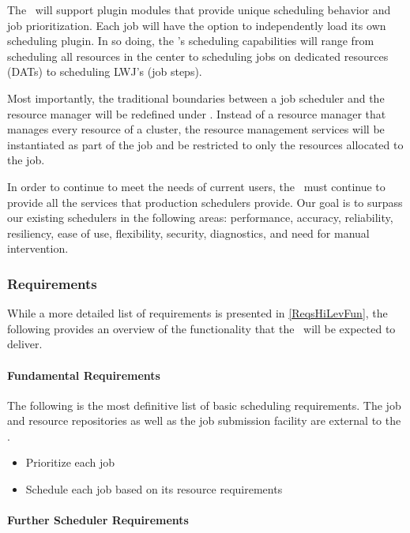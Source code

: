 The \ngjs\ will support plugin modules that provide unique scheduling
behavior and job prioritization.  Each job will have the option to
independently load its own scheduling plugin.  In so doing, the
\ngjs's scheduling capabilities will range from scheduling all
resources in the center to scheduling jobs on dedicated resources
(DATs) to scheduling LWJ's (job steps).

Most importantly, the traditional boundaries between a job scheduler
and the resource manager will be redefined under \ngrm.  Instead of a
resource manager that manages every resource of a cluster, the
resource management services will be instantiated as part of the job
and be restricted to only the resources allocated to the job.

In order to continue to meet the needs of current users, the
\ngjs\ must continue to provide all the services that production
schedulers provide.  Our goal is to surpass our existing schedulers in
the following areas: performance, accuracy, reliability, resiliency,
ease of use, flexibility, security, diagnostics, and need for manual
intervention.

\subsubsection{Requirements}

While a more detailed list of requirements is presented in
\ref{ReqsHiLevFun}, the following provides an overview of the
functionality that the \ngjs\ will be expected to deliver.

\paragraph{Fundamental Requirements}

The following is the most definitive list of basic scheduling
requirements.  The job and resource repositories as well as the job
submission facility are external to the \ngjs.

\begin{itemize}
  \item Prioritize each job
  \item Schedule each job based on its resource requirements
\end{itemize}

\paragraph{Further Scheduler Requirements}

